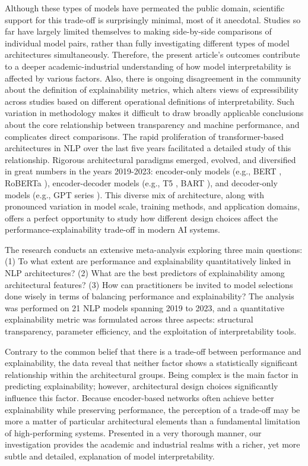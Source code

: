 \documentclass[preprint,12pt]{elsarticle}
\begin{document}
Although these types of models have permeated the public domain, scientific support for this trade-off is surprisingly minimal, most of it anecdotal. Studies so far have largely limited themselves to making side-by-side comparisons of individual model pairs, rather than fully investigating different types of model architectures simultaneously. Therefore, the present article's outcomes contribute to a deeper academic-industrial understanding of how model interpretability is affected by various factors. Also, there is ongoing disagreement in the community about the definition of explainability metrics, which alters views of expressibility across studies based on different operational definitions of interpretability. Such variation in methodology makes it difficult to draw broadly applicable conclusions about the core relationship between transparency and machine performance, and complicates direct comparisons. The rapid proliferation of transformer-based architectures in NLP over the last five years facilitated a detailed study of this relationship. Rigorous architectural paradigms emerged, evolved, and diversified in great numbers in the years 2019-2023: encoder-only models (e.g., BERT \cite{devlin2019bert}, RoBERTa \cite{liu2019roberta}), encoder-decoder models (e.g., T5 \cite{raffel2020t5}, BART \cite{lewis2020bart}), and decoder-only models (e.g., GPT series \cite{brown2020language}). This diverse mix of architecture, along with pronounced variation in model scale, training methods, and application domains, offers a perfect opportunity to study how different design choices affect the performance-explainability trade-off in modern AI systems.

The research conducts an extensive meta-analysis exploring three main questions: (1) To what extent are performance and explainability quantitatively linked in NLP architectures? (2) What are the best predictors of explainability among architectural features? (3) How can practitioners be invited to model selections done wisely in terms of balancing performance and explainability? The analysis was performed on 21 NLP models spanning 2019 to 2023, and a quantitative explainability metric was formulated across three aspects: structural transparency, parameter efficiency, and the exploitation of interpretability tools.

Contrary to the common belief that there is a trade-off between performance and explainability, the data reveal that neither factor shows a statistically significant relationship within the architectural groups. Being complex is the main factor in predicting explainability; however, architectural design choices significantly influence this factor. Because encoder-based networks often achieve better explainability while preserving performance, the perception of a trade-off may be more a matter of particular architectural elements than a fundamental limitation of high-performing systems. Presented in a very thorough manner, our investigation provides the academic and industrial realms with a richer, yet more subtle and detailed, explanation of model interpretability.
\end{document}
